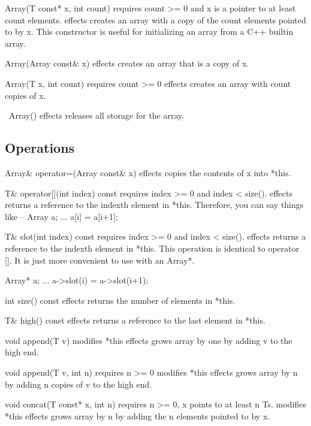 Array(T const* x, int count)
    requires   count >= 0 and x is a pointer to at least count elements.
    effects    creates an array with a copy of the count elements pointed
               to by x.  This constructor is useful for initializing an
               array from a C++ builtin array.

Array(Array const& x)
    effects    creates an array that is a copy of x.

Array(T x, int count)
    requires   count >= 0
    effects    creates an array with count copies of x.

~Array()
    effects    releases all storage for the array.

\subsection{Operations}

Array& operator=(Array const& x)
    effects    copies the contents of x into *this.

T& operator[](int index) const
    requires   index >= 0 and index < size().
    effects    returns a reference to the indexth element in *this.
               Therefore, you can say things like --
                    Array a;
                    ...
                    a[i] = a[i+1];

T& slot(int index) const
    requires   index >= 0 and index < size().
    effects    returns a reference to the indexth element in *this.
               This operation is identical to operator [].  It is
               just more convenient to use with an Array*.

                    Array* a;
                    ...
                    a->slot(i) = a->slot(i+1);

int  size() const
    effects    returns the number of elements in *this.

T& high() const
    effects    returns a reference to the last element in *this.

void append(T v)
    modifies   *this
    effects    grows array by one by adding v to the high end.

void append(T v, int n)
    requires   n >= 0
    modifies   *this
    effects    grows array by n by adding n copies of v to the high end.

void concat(T const* x, int n)
    requires   n >= 0, x points to at least n Ts.
    modifies   *this
    effects    grows array by n by adding the n elements pointed to by x.

